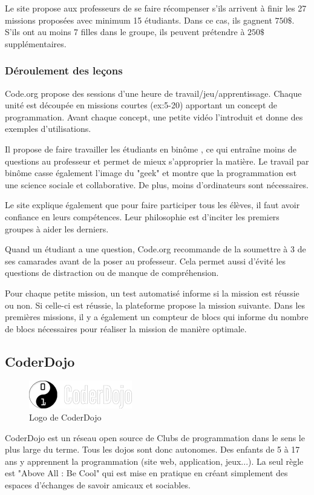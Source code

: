 Le site propose aux professeurs de se faire récompenser s'ils arrivent à finir les 27 missions proposées avec minimum 15 étudiants. Dans ce cas, ils gagnent $750\$$. S'ils ont au moins 7 filles dans le groupe, ils peuvent prétendre à $250\$$ supplémentaires.

\subsubsection{Déroulement des leçons}
Code.org propose des sessions d'une heure de travail/jeu/apprentissage. Chaque unité est découpée en missions courtes (ex:5-20) apportant un concept de programmation. Avant chaque concept, une petite vidéo l'introduit et donne des exemples d'utilisations.

Il propose de faire travailler les étudiants en binôme \cite{wiki-pair-prog}, ce qui entraîne moins de questions au professeur et permet de mieux s'approprier la matière. Le travail par binôme casse également l'image du "geek" et montre que la programmation est une science sociale et collaborative. De plus, moins d'ordinateurs sont nécessaires.

Le site explique également que pour faire participer tous les élèves, il faut avoir confiance en leurs compétences. Leur philosophie est d'inciter les premiers groupes à aider les derniers.

Quand un étudiant a une question, Code.org recommande de la soumettre à 3 de ses camarades avant de la poser au professeur. Cela permet aussi d'évité les questions de distraction ou de manque de compréhension.

Pour chaque petite mission, un test automatisé informe si la mission est réussie ou non. Si celle-ci est réussie, la plateforme propose la mission suivante. Dans les premières missions, il y a également un compteur de \glspl{bloc} qui informe du nombre de \glspl{bloc} nécessaires pour réaliser la mission de manière optimale.

\subsection{CoderDojo}
\begin{figure}[!ht]
  \begin{center}
    \includegraphics[scale=0.5]{content/5-related_work/images/dojo}
    \caption{Logo de CoderDojo}
    \label{fig:coder dojo}
  \end{center}
\end{figure}
CoderDojo \cite{dojo-about} est un réseau open source de Clubs de programmation dans le sens le plus large du terme. Tous les dojos sont donc autonomes. Des enfants de 5 à 17 ans y apprennent la programmation (site web, application, jeux...). La seul règle est "Above All : Be Cool" qui est mise en pratique en créant simplement des espaces d'échanges de savoir amicaux et sociables.

